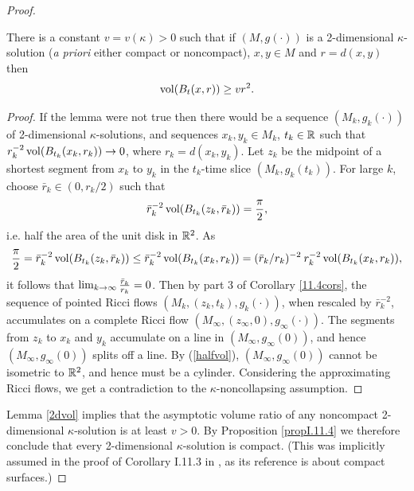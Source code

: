 \begin{proof}
\begin{lemma}
\label{2dvol}
There is a constant $v=v(\kappa)>0$ such that if
$(M,g(\cdot))$ is a 2-dimensional $\kappa$-solution
({\it a priori} either compact or noncompact), $x,y\in M$ and
$r = d(x,y)$ then
\begin{equation}
\label{volnotsmall}
\operatorname{vol}(B_t(x,r))\geq vr^2.
\end{equation}
\end{lemma}
\begin{proof}
If the lemma were not true then there would be a sequence $(M_k,g_k(\cdot))$
of 2-dimensional $\kappa$-solutions, and sequences $x_k,y_k\in M_k$, $t_k\in{\mathbb R}$
such that $r_k^{-2}\operatorname{vol}(B_{t_k}(x_k,r_k))\rightarrow 0$, where
$r_k = d(x_k,y_k)$.  Let $z_k$ be the midpoint of a shortest segment
from $x_k$ to $y_k$ in the $t_k$-time slice $(M_k,g_k(t_k))$. For large $k$,
choose
$\bar r_k \in (0, r_k/2)$ such that
\begin{equation}
\label{halfvol}
\bar r_k^{-2}\operatorname{vol}(B_{t_k}(z_k,\bar r_k))=\frac{\pi}{2},
\end{equation}
 i.e.
half the area of the  unit disk in ${\mathbb R}^2$.
As
\begin{equation}
\frac{\pi}{2} = \bar r_k^{-2}\operatorname{vol}(B_{t_k}(z_k,\bar r_k)) \le
\bar r_k^{-2}\operatorname{vol}(B_{t_k}(x_k, r_k)) =
(\bar r_k / r_k)^{-2} \:  r_k^{-2} \operatorname{vol}(B_{t_k}(x_k, r_k)),
\end{equation}
it follows that
$\lim_{k\rightarrow\infty}\frac{\bar r_k}{ r_k}=0$.
Then by part 3 of Corollary \ref{11.4cors},
the sequence of pointed Ricci flows $(M_k,(z_k,t_k),g_k(\cdot))$,
when rescaled by $\bar r_k^{-2}$, accumulates on a complete Ricci flow
$(M_\infty,(z_\infty,0),g_\infty(\cdot))$.  The segments from $z_k$
to $x_k$ and $y_k$ accumulate on a line in $(M_\infty,g_\infty(0))$,
and hence $(M_\infty,g_\infty(0))$ splits off a line.  By (\ref{halfvol}),
$(M_\infty,g_\infty(0))$ cannot be isometric to ${\mathbb R}^2$, and hence
must be a cylinder.  Considering the approximating
Ricci flows, we get a contradiction to the $\kappa$-noncollapsing assumption.
\end{proof}

\bigskip
Lemma \ref{2dvol} implies that the asymptotic volume ratio of any
noncompact 2-dimensional $\kappa$-solution is at least $v>0$.
By Proposition \ref{propI.11.4}
we therefore conclude that every 2-dimensional $\kappa$-solution
is compact.  (This was implicitly assumed in the
proof of Corollary I.11.3 in \cite{Perelman}, as its reference
\cite{Hamsurface} is about compact surfaces.)


\end{proof}
